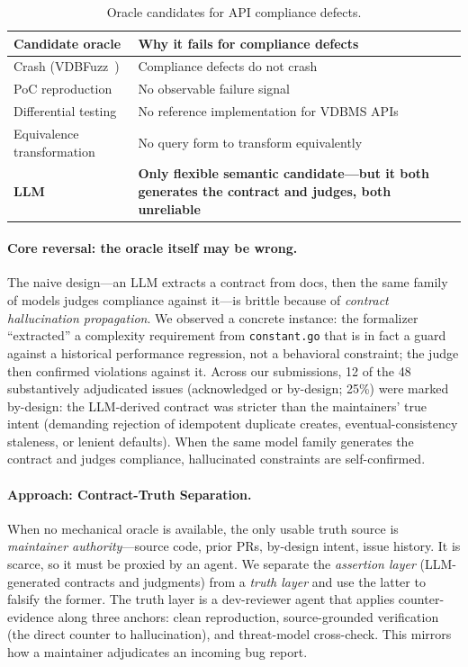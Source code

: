 \documentclass[sigconf]{acmart}
\begin{document}
\begin{table}[t]
\caption{Oracle candidates for API compliance defects.}
\label{tab:exclusion}
\small
\begin{tabular}{@{}p{}p{}@{}}
\toprule
Candidate oracle & Why it fails for compliance defects \\
\midrule
Crash (VDBFuzz~\cite{vdbfuzz26}) & Compliance defects do not crash \\
PoC reproduction & No observable failure signal \\
Differential testing & No reference implementation for VDBMS APIs \\
Equivalence transformation & No query form to transform equivalently \\
\textbf{LLM} & \textbf{Only flexible semantic candidate---but it both generates the contract and judges, both unreliable} \\
\bottomrule
\end{tabular}
\end{table}

\paragraph{Core reversal: the oracle itself may be wrong.}
The naive design---an LLM extracts a contract from docs, then the same family of models judges compliance against it---is brittle because of \emph{contract hallucination propagation}. We observed a concrete instance: the formalizer ``extracted'' a complexity requirement from \texttt{constant.go} that is in fact a guard against a historical performance regression, not a behavioral constraint; the judge then confirmed violations against it. Across our submissions, 12 of the 48 substantively adjudicated issues (acknowledged or by-design; 25\%) were marked by-design: the LLM-derived contract was stricter than the maintainers' true intent (demanding rejection of idempotent duplicate creates, eventual-consistency staleness, or lenient defaults). When the same model family generates the contract and judges compliance, hallucinated constraints are self-confirmed.

\paragraph{Approach: Contract-Truth Separation.}
When no mechanical oracle is available, the only usable truth source is \emph{maintainer authority}---source code, prior PRs, by-design intent, issue history. It is scarce, so it must be proxied by an agent. We separate the \emph{assertion layer} (LLM-generated contracts and judgments) from a \emph{truth layer} and use the latter to falsify the former. The truth layer is a dev-reviewer agent that applies counter-evidence along three anchors: clean reproduction, source-grounded verification (the direct counter to hallucination), and threat-model cross-check. This mirrors how a maintainer adjudicates an incoming bug report.
\end{document}
